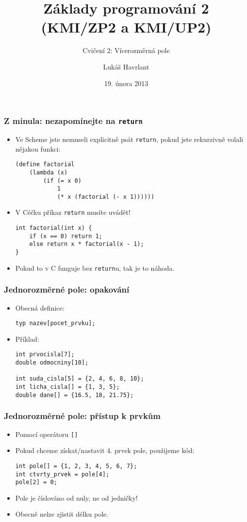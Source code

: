 \documentclass{beamer}
\title{Základy programování 2 (KMI/ZP2 a KMI/UP2)}
\subtitle{Cvičení 2: Vícerozměrná pole}
\author{Lukáš Havrlant}
\date{19. února 2013}
\institute{Univerzita Palackého}
\newenvironment{itemizex}%
  {\large \begin{itemize}%
    \setlength{\itemsep}{8pt}%
    \setlength{\parskip}{8pt}}%
  {\end{itemize}}
\begin{document}
\begin{frame}[t,plain]
\titlepage
\end{frame}


\begin{frame}[t,fragile]\frametitle{Z minula: nezapomínejte na \texttt{return}} 
\begin{itemize}
    \item Ve Scheme jste nemuseli explicitně psát \texttt{return}, pokud jste rekurzivně volali nějakou funkci:
\begin{verbatim} 
(define factorial 
    (lambda (x)
        (if (= x 0) 
            1
            (* x (factorial (- x 1))))))
\end{verbatim}
    \item V Céčku příkaz \texttt{return} musíte uvádět!
\begin{verbatim} 
int factorial(int x) {
    if (x == 0) return 1;
    else return x * factorial(x - 1);
}
\end{verbatim}
    \item Pokud to v C funguje bez \texttt{return}u, tak je to náhoda.
\end{itemize}
\end{frame}


\begin{frame}[t,fragile]\frametitle{Jednorozměrné pole: opakování} 
  \begin{itemizex}
    \item Obecná definice:
    \begin{verbatim} 
typ nazev[pocet_prvku];
    \end{verbatim}
    \item Příklad:
    \begin{verbatim} 
int prvocisla[7];
double odmocniny[10];

int suda_cisla[5] = {2, 4, 6, 8, 10};
int licha_cisla[] = {1, 3, 5};
double dane[] = {16.5, 18, 21.75};
    \end{verbatim}
  \end{itemizex}
\end{frame}



\begin{frame}[t,fragile]\frametitle{Jednorozměrné pole: přístup k prvkům} 
\vskip 0.4cm
\begin{itemizex}
    \item Pomocí operátoru \texttt{[]}
    \item Pokud chceme získat/nastavit 4. prvek pole, použijeme kód:
    \begin{verbatim} 
int pole[] = {1, 2, 3, 4, 5, 6, 7};
int ctvrty_prvek = pole[4];
pole[2] = 0;
    \end{verbatim}
    \item Pole je číslováno od nuly, ne od jedničky!
    \item Obecně nelze zjistit délku pole. 
  \end{itemizex}
\end{frame}
\end{document}
